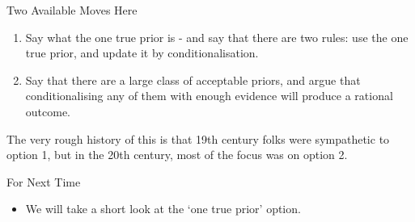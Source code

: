 \documentclass[
  ignorenonframetext,
]{beamer}
\providecommand{\tightlist}{%
  \setlength{\itemsep}{0pt}\setlength{\parskip}{0pt}}
\renewcommand{\,}{\text{, }}
\begin{document}
\begin{frame}{Two Available Moves Here}
\protect\hypertarget{two-available-moves-here}{}
\begin{enumerate}
\tightlist
\item
  Say what the one true prior is - and say that there are two rules: use
  the one true prior, and update it by conditionalisation. \pause
\item
  Say that there are a large class of acceptable priors, and argue that
  conditionalising any of them with enough evidence will produce a
  rational outcome. \pause
\end{enumerate}

The very rough history of this is that 19th century folks were
sympathetic to option 1, but in the 20th century, most of the focus was
on option 2.
\end{frame}

\begin{frame}{For Next Time}
\protect\hypertarget{for-next-time}{}
\begin{itemize}
\tightlist
\item
  We will take a short look at the `one true prior' option.
\end{itemize}
\end{frame}
\end{document}
